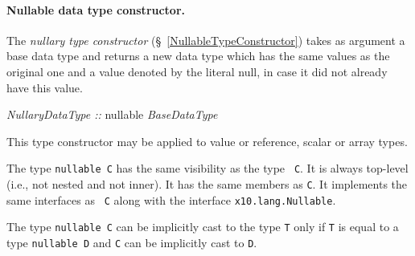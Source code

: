 \paragraph{Nullable data type constructor.}
The {\em nullary type constructor} (\S~\ref{NullableTypeConstructor})
takes as argument a base data type and returns a new data type which
has the same values as the original one and a value denoted by the
literal {\cf null}, in case it did not already have this value.

\begin{x10}
{\em NullaryDataType ::}
   nullable \em{BaseDataType}
\end{x10}

This type constructor may be applied to value or reference, scalar or
array types.

The type {\tt nullable C} has the same visibility as the type {\tt
C}. It is always top-level (i.e., not nested and not inner). It has
the same members as {\tt C}. It implements the same interfaces as {\tt
C} along with the interface {\tt x10.lang.Nullable}.

The type {\tt nullable C} can be implicitly cast to the type {\tt T}
only if {\tt T} is equal to a type {\tt nullable D} and {\tt C} can be
implicitly cast to {\tt D}.
